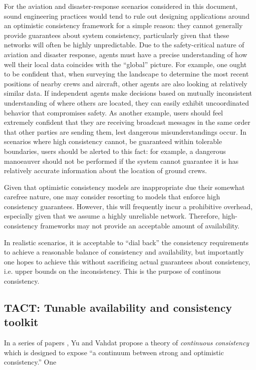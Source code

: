 For the aviation and disaster-response scenarios considered in this
document, sound engineering practices would tend to rule out designing
applications around an optimistic consistency framework for a simple
reason: they cannot generally provide guarantees about system
consistency, particularly given that these networks will often be
highly unpredictable. Due to the safety-critical nature of aviation
and disaster response, agents must have a precise understanding of how
well their local data coincides with the ``global'' picture. For
example, one ought to be confident that, when surveying the landscape
to determine the most recent positions of nearby crews and aircraft,
other agents are also looking at relatively similar data. If
independent agents make decisions based on mutually inconsistent
understanding of where others are located, they can easily exhibit
uncoordinated behavior that compromises safety. As another example,
users should feel extremely confident that they are receiving
broadcast messages in the same order that other parties are sending
them, lest dangerous misunderstandings occur. In scenarios where high
consistency cannot, be guaranteed within tolerable boundaries, users
should be alerted to this fact: for example, a dangerous manoeauver
should not be performed if the system cannot guarantee it is has
relatively accurate information about the location of ground crews.

Given that optimistic consistency models are inappropriate due their
somewhat carefree nature, one may consider resorting to models that
enforce high consistency guarantees. However, this will frequently
incur a prohibitive overhead, especially given that we assume a highly
unreliable network. Therefore, high-consistency frameworks may not
provide an acceptable amount of availability.

In realistic scenarios, it is acceptable to ``dial back'' the
consistency requirements to achieve a reasonable balance of
consistency and availability, but importantly one hopes to achieve
this without sacrificing actual guarantees about consistency,
i.e. upper bounds on the inconsistency. This is the purpose of continous consistency.


\subsection{TACT: Tunable availability and consistency toolkit}

In a series of papers \cite{2000tact} \cite{2000tactalgorithms}
\cite{2002tact}, Yu and Vahdat propose a theory of \emph{continuous
consistency} which is designed to expose ``a continuum between strong
and optimistic consistency.'' One

